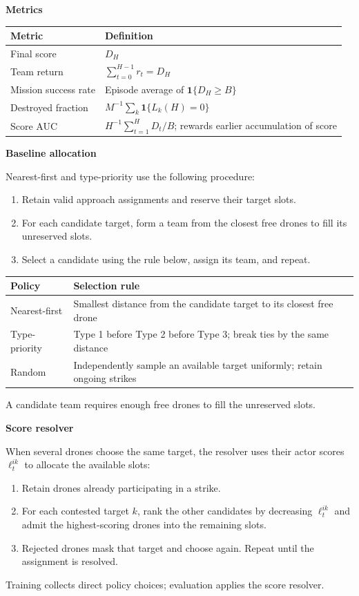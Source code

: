 \documentclass[11pt,a4paper]{article}
\newcommand{\ind}{\mathbf 1}
\newcommand{\lead}[1]{\medskip\textbf{#1}\par}
\begin{document}
\lead{Metrics}
\begin{center}
\begin{tabularx}{\linewidth}{@{}lX@{}}
\toprule
Metric & Definition \\
\midrule
Final score & $D_H$ \\
Team return & $\sum_{t=0}^{H-1}r_t=D_H$ \\
Mission success rate & Episode average of $\ind\{D_H\ge B\}$ \\
Destroyed fraction & $M^{-1}\sum_k\ind\{L_k(H)=0\}$ \\
Score AUC & $H^{-1}\sum_{t=1}^{H}D_t/B$; rewards earlier accumulation of score \\
\bottomrule
\end{tabularx}
\end{center}

\lead{Baseline allocation}
Nearest-first and type-priority use the following procedure:
\begin{enumerate}
\item Retain valid approach assignments and reserve their target slots.
\item For each candidate target, form a team from the closest free drones to fill its unreserved slots.
\item Select a candidate using the rule below, assign its team, and repeat.
\end{enumerate}
\begin{center}
\begin{tabularx}{\linewidth}{@{}lX@{}}
\toprule
Policy & Selection rule \\
\midrule
Nearest-first & Smallest distance from the candidate target to its closest free drone \\
Type-priority & Type 1 before Type 2 before Type 3; break ties by the same distance \\
Random & Independently sample an available target uniformly; retain ongoing strikes \\
\bottomrule
\end{tabularx}
\end{center}
A candidate team requires enough free drones to fill the unreserved slots.

\lead{Score resolver}
When several drones choose the same target, the resolver uses their actor
scores $\ell_t^{ik}$ to allocate the available slots:
\begin{enumerate}
\item Retain drones already participating in a strike.
\item For each contested target $k$, rank the other candidates by
decreasing $\ell_t^{ik}$ and admit the highest-scoring drones into the remaining slots.
\item Rejected drones mask that target and choose again. Repeat until the
assignment is resolved.
\end{enumerate}
Training collects direct policy choices; evaluation applies the score resolver.
\end{document}
